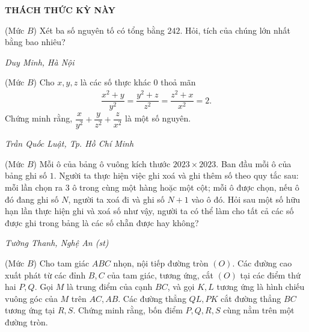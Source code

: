 \begin{center}
	\vspace*{-5pt}
	\textbf{\color{thachthuctoanhoc}THÁCH THỨC KỲ NÀY}
	\vspace*{-5pt}
\end{center}
\begin{multicols}{2}
	\setlength{\abovedisplayskip}{4pt}
	\setlength{\belowdisplayskip}{4pt}
	{}
	(Mức $B$) Xét ba số nguyên tố có tổng bằng $242$. Hỏi,  tích của chúng lớn nhất bằng bao nhiêu?
	\begin{flushright}
		\textit{Duy Minh, Hà Nội}
	\end{flushright}
	{}
	(Mức $B$) Cho $x,y,z$ là các số thực khác $0$ thoả mãn 
	\begin{align*}
		\dfrac{x^2+y}{y^2}=\dfrac{y^2+z}{z^2}=\dfrac{z^2+x}{x^2}=2.
	\end{align*}
	Chứng minh rằng, $\dfrac x{y^2}+\dfrac y{z^2}+\dfrac z{x^2}$ là một số nguyên.
	\begin{flushright}
		\textit{Trần Quốc Luật, Tp. Hồ Chí Minh}
	\end{flushright}
	{}
	(Mức $B$) Mỗi ô của bảng ô vuông kích thước $2023\times2023$. Ban đầu mỗi ô của bảng ghi số $1$. Người ta thực hiện việc ghi xoá và ghi thêm số theo quy tắc sau: mỗi lần chọn ra $3$ ô trong cùng một hàng hoặc một cột; mỗi ô được chọn, nếu ô đó đang ghi số $N$, người ta xoá đi và ghi số $N+1$ vào ô đó. 
	\vskip 0.05cm
	Hỏi sau một số hữu hạn lần thực hiện ghi và xoá số như vậy, người ta có thể làm cho tất cả các số được ghi trong bảng là các số chẵn được hay không?
	\begin{flushright}
		\textit{Tường Thanh, Nghệ An (st)}
	\end{flushright}
	{}
	(Mức $B$) Cho tam giác $ABC$ nhọn, nội tiếp đường tròn $(O)$. Các đường cao xuất phát từ các đỉnh $B,C$ của tam giác, tương ứng, cắt $(O)$ tại các điểm thứ hai $P,Q$. Gọi $M$ là trung điểm của cạnh $BC$, và gọi $K, L$ tương ứng là hình chiếu vuông góc của $M$ trên $AC, A B$. Các đường thẳng $Q L, P K$ cắt đường thẳng $B C$ tương ứng tại $R, S$. Chứng minh rằng, bốn điểm $P, Q, R, S$ cùng nằm trên một đường tròn.
	\begin{figure}[H]
		\vspace*{-5pt}
		\centering
		\captionsetup{labelformat= empty, justification=centering}

\end{figure}
\end{multicols}
